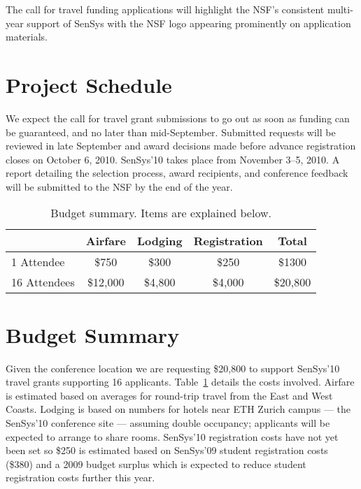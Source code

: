The call for travel funding applications will highlight the NSF's consistent
multi-year support of SenSys with the NSF logo appearing prominently on
application materials.

\section{Project Schedule}

We expect the call for travel grant submissions to go out as soon as funding
can be guaranteed, and no later than mid-September. Submitted requests will
be reviewed in late September and award decisions made before advance
registration closes on October 6, 2010. SenSys'10 takes place from November
3--5, 2010. A report detailing the selection process, award recipients, and
conference feedback will be submitted to the NSF by the end of the year.

\begin{table}[t]
\begin{center}
\begin{tabular}{|l|ccc|c|}
\hline
& \textbf{Airfare} & \textbf{Lodging} & \textbf{Registration} & \textbf{Total} \\
\hline \hline
1 Attendee & \$750 & \$300 & \$250 & \$1300 \\
16 Attendees & \$12,000 & \$4,800 & \$4,000 & \$20,800 \\
\hline
\end{tabular}
\end{center}
\caption{Budget summary. Items are explained below.}
\label{table-budget}
\end{table}

\section{Budget Summary}

Given the conference location we are requesting \$20,800 to support SenSys'10
travel grants supporting 16 applicants. Table~\ref{table-budget} details the
costs involved. Airfare is estimated based on averages for round-trip travel
from the East and West Coasts. Lodging is based on numbers for hotels near
ETH Zurich campus --- the SenSys'10 conference site --- assuming double
occupancy; applicants will be expected to arrange to share rooms. SenSys'10
registration costs have not yet been set so \$250 is estimated based on
SenSys'09 student registration costs (\$380) and a 2009 budget surplus which
is expected to reduce student registration costs further this year.

